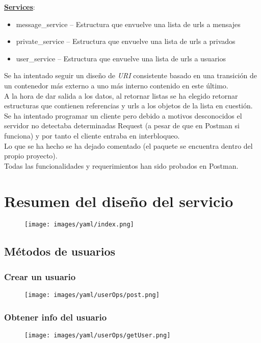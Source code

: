 \documentclass[12pt,a4paper, spanish]{article}
\begin{document}
\textbf{\underline{Services}}:
\begin{itemize}
	\item message\_service – Estructura que envuelve una lista de urls a mensajes
	\item private\_service – Estructura que envuelve una lista de urls a privados
	\item user\_service – Estructura que envuelve una lista de urls a usuarios
\end{itemize}

Se ha intentado seguir un diseño de \textit{URI} consistente basado en una transición de un contenedor más externo a uno más interno contenido en este último.\\

A la hora de dar salida a los datos, al retornar listas se ha elegido retornar estructuras que contienen referencias y urls a los objetos de la lista en cuestión.
Se ha intentado programar un cliente pero debido a motivos desconocidos el servidor no detectaba determinadas Request (a pesar de que en Postman si funciona) y por tanto el cliente entraba en interbloqueo.\\

Lo que se ha hecho se ha dejado comentado (el paquete se encuentra dentro del propio proyecto).\\

Todas las funcionalidades y requerimientos han sido probados en Postman.

\newpage
\section{Resumen del diseño del servicio}
	\begin{figure}[H]
		\centering
		\texttt{[image: images/yaml/index.png]}
	\end{figure}
\subsection{Métodos de usuarios}
\subsubsection{Crear un usuario}
\begin{figure}[H]
	\centering
	\texttt{[image: images/yaml/userOps/post.png]}
\end{figure}
\subsubsection{Obtener info del usuario}
\begin{figure}[H]
	\centering
	\texttt{[image: images/yaml/userOps/getUser.png]}
\end{figure}
\end{document}
